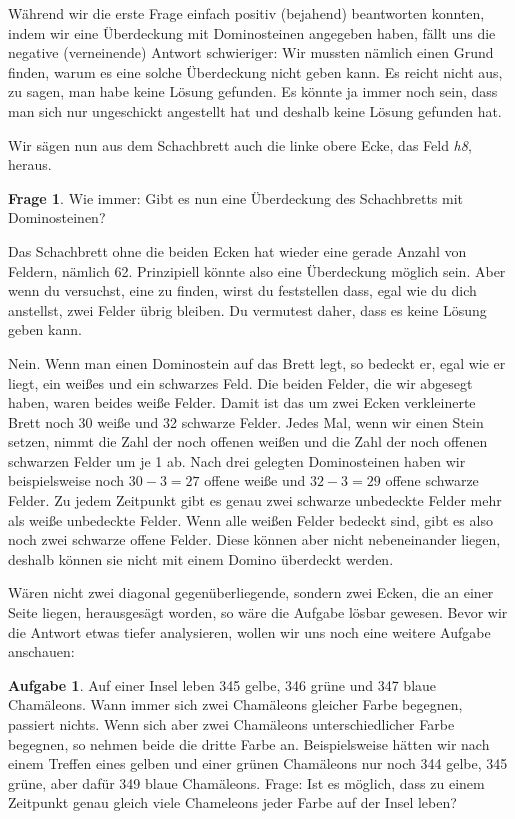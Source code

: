 \documentclass[a4paper,ngerman,12pt]{scrartcl}
\theoremstyle{definition}
\newtheorem*{aufg}{Aufgabe}
\newtheorem*{frage}{Frage}
\begin{document}
Während wir die erste Frage einfach positiv (bejahend) beantworten konnten, indem wir eine Überdeckung mit Dominosteinen angegeben haben, fällt uns die negative (verneinende) Antwort schwieriger: Wir mussten nämlich einen Grund finden, warum es eine solche Überdeckung nicht geben kann. Es reicht nicht aus, zu sagen, man habe keine Lösung gefunden. Es könnte ja immer noch sein, dass man sich nur ungeschickt angestellt hat und deshalb keine Lösung gefunden hat.

Wir sägen nun aus dem Schachbrett auch die linke obere Ecke, das Feld \emph{h8}, heraus.

\begin{frage}
  Wie immer: Gibt es nun eine Überdeckung des Schachbretts mit Dominosteinen?
\end{frage}

Das Schachbrett ohne die beiden Ecken hat wieder eine gerade Anzahl von Feldern, nämlich 62. Prinzipiell könnte also eine Überdeckung möglich sein. Aber wenn du versuchst, eine zu finden, wirst du feststellen dass, egal wie du dich anstellst, zwei Felder übrig bleiben. Du vermutest daher, dass es keine Lösung geben kann.

\begin{antw}
  Nein. Wenn man einen Dominostein auf das Brett legt, so bedeckt er, egal wie er liegt, ein weißes und ein schwarzes Feld. Die beiden Felder, die wir abgesegt haben, waren beides weiße Felder. Damit ist das um zwei Ecken verkleinerte Brett noch 30 weiße und 32 schwarze Felder. Jedes Mal, wenn wir einen Stein setzen, nimmt die Zahl der noch offenen weißen und die Zahl der noch offenen schwarzen Felder um je 1 ab. Nach drei gelegten Dominosteinen haben wir beispielsweise noch $30-3=27$ offene weiße und $32-3=29$ offene schwarze Felder. Zu jedem Zeitpunkt gibt es genau zwei schwarze unbedeckte Felder mehr als weiße unbedeckte Felder. Wenn alle weißen Felder bedeckt sind, gibt es also noch zwei schwarze offene Felder. Diese können aber nicht nebeneinander liegen, deshalb können sie nicht mit einem Domino überdeckt werden.
\end{antw}

Wären nicht zwei diagonal gegenüberliegende, sondern zwei Ecken, die an einer Seite liegen, herausgesägt worden, so wäre die Aufgabe lösbar gewesen. Bevor wir die Antwort etwas tiefer analysieren, wollen wir uns noch eine weitere Aufgabe anschauen:

\begin{aufg}
  Auf einer Insel leben 345 gelbe, 346 grüne und 347 blaue Chamäleons. Wann immer sich zwei Chamäleons gleicher Farbe begegnen, passiert nichts. Wenn sich aber zwei Chamäleons unterschiedlicher Farbe begegnen, so nehmen beide die dritte Farbe an. Beispielsweise hätten wir nach einem Treffen eines gelben und einer grünen Chamäleons nur noch 344 gelbe, 345 grüne, aber dafür 349 blaue Chamäleons. Frage: Ist es möglich, dass zu einem Zeitpunkt genau gleich viele Chameleons jeder Farbe auf der Insel leben?
\end{aufg}
\end{document}
